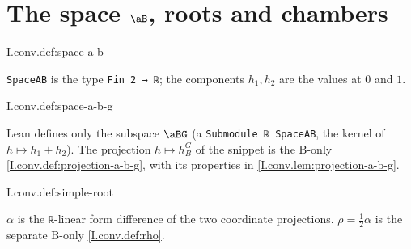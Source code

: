 \section{\texorpdfstring{The space $\aB$, roots and chambers}{The space 𝔞B, roots and chambers}}

\begin{definition}
\end{definition}
\begin{tfformal}{I.conv.def:space-a-b}
\begin{tffidelity}
\texttt{SpaceAB} is the type \texttt{Fin 2 → ℝ}; the components $h_1,h_2$ are the values at $0$ and $1$.
\end{tffidelity}
\end{tfformal}

\begin{definition}
\end{definition}
\begin{tfformal}{I.conv.def:space-a-b-g}
\begin{tffidelity}
Lean defines only the subspace $\aBG$ (a \texttt{Submodule ℝ SpaceAB}, the kernel of $h\mapsto h_1+h_2$). The projection $h\mapsto h_B^G$ of the snippet is the B-only \cref{I.conv.def:projection-a-b-g}, with its properties in \cref{I.conv.lem:projection-a-b-g}.
\end{tffidelity}
\end{tfformal}

\begin{definition}
\end{definition}
\begin{tfformal}{I.conv.def:simple-root}
\begin{tffidelity}
$\alpha$ is the \texttt{ℝ}-linear form difference of the two coordinate projections. $\rho=\frac12\alpha$ is the separate B-only \cref{I.conv.def:rho}.
\end{tffidelity}
\end{tfformal}

